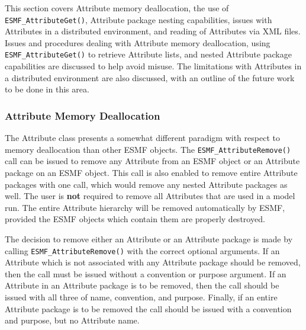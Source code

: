 %

This section covers Attribute memory deallocation, the use of {\tt ESMF\_AttributeGet()}, Attribute package nesting capabilities, issues with Attributes in a distributed environment, and reading of Attributes via XML files.  Issues and procedures dealing with Attribute memory deallocation, using {\tt ESMF\_AttributeGet()} to retrieve Attribute lists, and nested Attribute package capabilities are discussed to help avoid misuse.  The limitations with Attributes in a distributed environment are also discussed, with an outline of the future work to be done in this area. 

\subsubsection{Attribute Memory Deallocation}

The Attribute class presents a somewhat different paradigm with respect to memory deallocation than other ESMF objects.  The {\tt ESMF\_AttributeRemove()} call can be issued to remove any Attribute from an ESMF object or an Attribute package on an ESMF object.  This call is also enabled to remove entire Attribute packages with one call, which would remove any nested Attribute packages as well.  The user is {\bf not} required to remove all Attributes that are used in a model run.  The entire Attribute hierarchy will be removed automatically by ESMF, provided the ESMF objects which contain them are properly destroyed.  

The decision to remove either an Attribute or an Attribute package is made by calling {\tt ESMF\_AttributeRemove()} with the correct optional arguments.  If an Attribute which is not associated with any Attribute package should be removed, then the call must be issued without a convention or purpose argument.  If an Attribute in an Attribute package is to be removed, then the call should be issued with all three of name, convention, and purpose.  Finally, if an entire Attribute package is to be removed the call should be issued with a convention and purpose, but no Attribute name.

